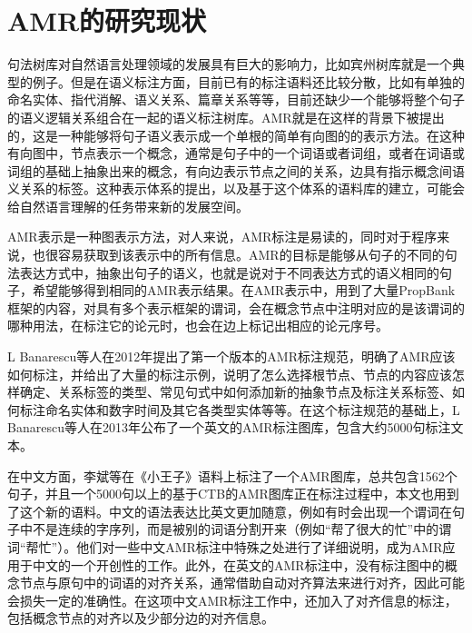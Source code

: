\documentclass[master, winfont]{njuthesis}
\begin{document}
\section{AMR的研究现状}
句法树库对自然语言处理领域的发展具有巨大的影响力，比如宾州树库就是一个典型的例子。但是在语义标注方面，目前已有的标注语料还比较分散，比如有单独的命名实体、指代消解、语义关系、篇章关系等等，目前还缺少一个能够将整个句子的语义逻辑关系组合在一起的语义标注树库。AMR就是在这样的背景下被提出的，这是一种能够将句子语义表示成一个单根的简单有向图的的表示方法。在这种有向图中，节点表示一个概念，通常是句子中的一个词语或者词组，或者在词语或词组的基础上抽象出来的概念，有向边表示节点之间的关系，边具有指示概念间语义关系的标签。这种表示体系的提出，以及基于这个体系的语料库的建立，可能会给自然语言理解的任务带来新的发展空间。

AMR表示是一种图表示方法\cite{Banarescu2013Abstract}，对人来说，AMR标注是易读的，同时对于程序来说，也很容易获取到该表示中的所有信息。AMR的目标是能够从句子的不同的句法表达方式中，抽象出句子的语义，也就是说对于不同表达方式的语义相同的句子，希望能够得到相同的AMR表示结果。在AMR表示中，用到了大量PropBank框架的内容，对具有多个表示框架的谓词，会在概念节点中注明对应的是该谓词的哪种用法，在标注它的论元时，也会在边上标记出相应的论元序号。

L Banarescu等人\cite{banarescu2012abstract}在2012年提出了第一个版本的AMR标注规范，明确了AMR应该如何标注，并给出了大量的标注示例，说明了怎么选择根节点、节点的内容应该怎样确定、关系标签的类型、常见句式中如何添加新的抽象节点及标注关系标签、如何标注命名实体和数字时间及其它各类型实体等等。在这个标注规范的基础上，L Banarescu等人\cite{Banarescu2013Abstract}在2013年公布了一个英文的AMR标注图库，包含大约5000句标注文本。

在中文方面，李斌等\cite{Li2016Annotating}在《小王子》语料上标注了一个AMR图库，总共包含1562个句子，并且一个5000句以上的基于CTB的AMR图库正在标注过程中，本文也用到了这个新的语料。中文的语法表达比英文更加随意，例如有时会出现一个谓词在句子中不是连续的字序列，而是被别的词语分割开来（例如“帮了很大的忙”中的谓词“帮忙”）。他们对一些中文AMR标注中特殊之处进行了详细说明，成为AMR应用于中文的一个开创性的工作。此外，在英文的AMR标注中，没有标注图中的概念节点与原句中的词语的对齐关系，通常借助自动对齐算法来进行对齐，因此可能会损失一定的准确性。在这项中文AMR标注工作中，还加入了对齐信息的标注，包括概念节点的对齐以及少部分边的对齐信息。
\end{document}
